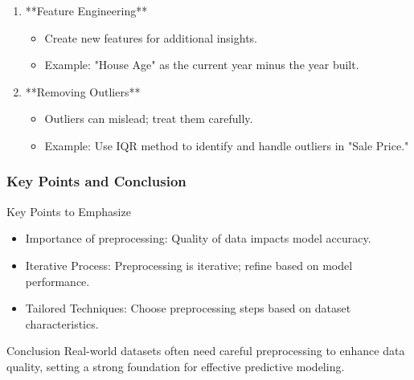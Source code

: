 \documentclass[aspectratio=169]{beamer}
\begin{document}
\begin{frame}[fragile]
\begin{enumerate}
        \item **Feature Engineering**
            \begin{itemize}
                \item Create new features for additional insights.
                \item Example: "House Age" as the current year minus the year built.
            \end{itemize}
        
        \item **Removing Outliers**
            \begin{itemize}
                \item Outliers can mislead; treat them carefully.
                \item Example: Use IQR method to identify and handle outliers in "Sale Price."
            \end{itemize}
    \end{enumerate}
\end{frame}

\begin{frame}[fragile]
    \frametitle{Key Points and Conclusion}
    \begin{block}{Key Points to Emphasize}
        \begin{itemize}
            \item Importance of preprocessing: Quality of data impacts model accuracy.
            \item Iterative Process: Preprocessing is iterative; refine based on model performance.
            \item Tailored Techniques: Choose preprocessing steps based on dataset characteristics.
        \end{itemize}
    \end{block}

    \begin{block}{Conclusion}
        Real-world datasets often need careful preprocessing to enhance data quality, setting a strong foundation for effective predictive modeling.
    \end{block}
\end{frame}
\end{document}
